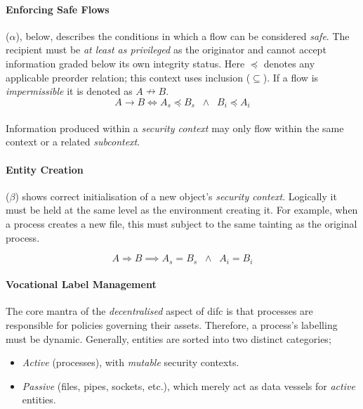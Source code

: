 \paragraph{Enforcing Safe Flows} ($\alpha$), below, describes the conditions in which a flow can be considered \textit{safe}. The recipient must be \textit{at least as privileged} as the originator and cannot accept information graded below its own integrity status. Here $\preceq$ denotes any applicable preorder relation; this context uses inclusion ($\subseteq$). If a flow is \textit{impermissible} it is denoted as $A \nrightarrow B$.
\begin{equation}
    A \rightarrow B \iff A_s \preceq B_s \;\; \land \;\; B_i \preceq A_i \tag{$\alpha$}
\end{equation}
\vspace{-12mm}

\paragraph{} Information produced within a \textit{security context} may only flow within the same context or a related \textit{subcontext}.

\paragraph{Entity Creation} ($\beta$) shows correct initialisation of a new object's \textit{security context}. Logically it must be held at the same level as the environment creating it. For example, when a process creates a new file, this must subject to the same tainting as the original process.

\vspace{-5mm}
\begin{equation}
    A \Rightarrow B \implies A_s = B_s \;\; \land \;\; A_i = B_i \tag{$\beta$}
\end{equation}

\paragraph{Vocational Label Management} The core mantra of the \textit{decentralised} aspect of \acrshort{difc} is that processes are responsible for policies governing their assets. Therefore, a process's labelling must be dynamic. Generally, entities are sorted into two distinct categories;

\begin{itemize}
    \item \textit{Active} (processes), with \textit{mutable} security contexts.
    \item \textit{Passive} (files, pipes, sockets, etc.), which merely act as data vessels for \textit{active} entities.
\end{itemize}

